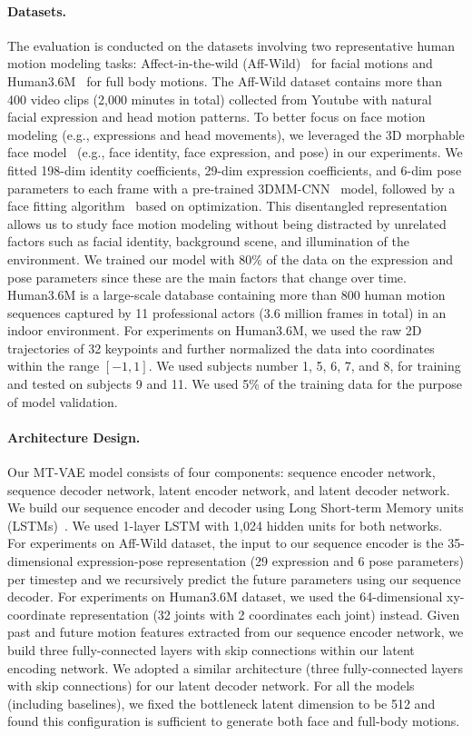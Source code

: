 \documentclass[runningheads]{llncs}
\begin{document}
\paragraph{Datasets.} The evaluation is conducted on the datasets involving two representative human motion modeling tasks: Affect-in-the-wild  (Aff-Wild)~\cite{zafeiriou2017aff} for facial motions and Human3.6M~\cite{ionescu2014human3} for full body motions.
The Aff-Wild dataset contains more than 400 video clips (2,000 minutes in total) collected from Youtube with natural facial expression and head motion patterns.
To better focus on face motion modeling (e.g., expressions and head movements), we leveraged the 3D morphable face model~\cite{bfm09,blanz1999morphable} (e.g., face identity, face expression, and pose) in our experiments.
We fitted 198-dim identity coefficients, 29-dim expression coefficients, and 6-dim pose parameters to each frame with a pre-trained 3DMM-CNN~\cite{tran2017regressing} model, followed by a face fitting algorithm~\cite{zhu2016face} based on optimization.
This disentangled representation allows us to study face motion modeling without being distracted by unrelated factors such as facial identity, background scene, and illumination of the environment.
We trained our model with 80\% of the data on the expression and pose parameters since these are the main factors that change over time.
Human3.6M is a large-scale database containing more than 800 human motion sequences captured by 11 professional actors (3.6 million frames in total) in an indoor environment.
For experiments on Human3.6M, we used the raw 2D trajectories of 32 keypoints and further normalized the data into coordinates within the range $[-1, 1]$.
We used subjects number 1, 5, 6, 7, and 8, for training and tested on subjects 9 and 11.
We used 5\% of the training data for the purpose of model validation.
\paragraph{Architecture Design.}
\vspace*{-0.1in}
Our MT-VAE model consists of four components: sequence encoder network, sequence decoder network, latent encoder network, and latent decoder network.
We build our sequence encoder and decoder using Long Short-term Memory units (LSTMs)~\cite{hochreiter1997long}. We used 1-layer LSTM with 1,024 hidden units for both networks.
For experiments on Aff-Wild dataset, the input to our sequence encoder is the 35-dimensional expression-pose representation (29 expression and 6 pose parameters) per timestep and we recursively predict the future parameters using our sequence decoder.
For experiments on Human3.6M dataset, we used the 64-dimensional xy-coordinate representation (32 joints with 2 coordinates each joint) instead.
Given past and future motion features extracted from our sequence encoder network, we build three fully-connected layers with skip connections within our latent encoding network.
We adopted a similar architecture (three fully-connected layers with skip connections) for our latent decoder network.
For all the models (including baselines), we fixed the bottleneck latent dimension to be 512 and found this configuration is sufficient to generate both face and full-body motions.
\end{document}
